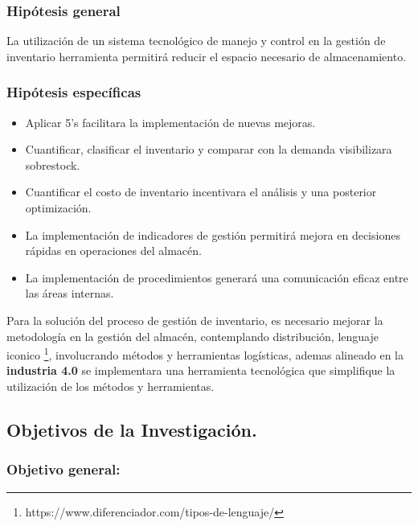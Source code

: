 \documentclass[11pt]{article}
\providecommand{\tightlist}{%
      \setlength{\itemsep}{0pt}\setlength{\parskip}{0pt}}
\begin{document}
\hypertarget{hipuxf3tesis-general}{%
\subsubsection{Hipótesis general}\label{hipuxf3tesis-general}}

La utilización de un sistema tecnológico de manejo y control en la
gestión de inventario herramienta permitirá reducir el espacio necesario
de almacenamiento.

\hypertarget{hipuxf3tesis-especuxedficas}{%
\subsubsection{Hipótesis
específicas}\label{hipuxf3tesis-especuxedficas}}

\begin{itemize}
\tightlist
\item
  Aplicar 5's facilitara la implementación de nuevas mejoras.
\item
  Cuantificar, clasificar el inventario y comparar con la demanda
  visibilizara sobrestock.
\item
  Cuantificar el costo de inventario incentivara el análisis y una
  posterior optimización.
\item
  La implementación de indicadores de gestión permitirá mejora en
  decisiones rápidas en operaciones del almacén.
\item
  La implementación de procedimientos generará una comunicación eficaz
  entre las áreas internas.
\end{itemize}

Para la solución del proceso de gestión de inventario, es necesario
mejorar la metodología en la gestión del almacén, contemplando
distribución, lenguaje iconico \footnote{https://www.diferenciador.com/tipos-de-lenguaje/},
involucrando métodos y herramientas logísticas, ademas alineado en la
\textbf{industria 4.0} se implementara una herramienta tecnológica que
simplifique la utilización de los métodos y herramientas.

\hypertarget{objetivos-de-la-investigaciuxf3n.}{%
\subsection{Objetivos de la
Investigación.}\label{objetivos-de-la-investigaciuxf3n.}}

\hypertarget{objetivo-general}{%
\subsubsection{Objetivo general:}\label{objetivo-general}}
\end{document}
